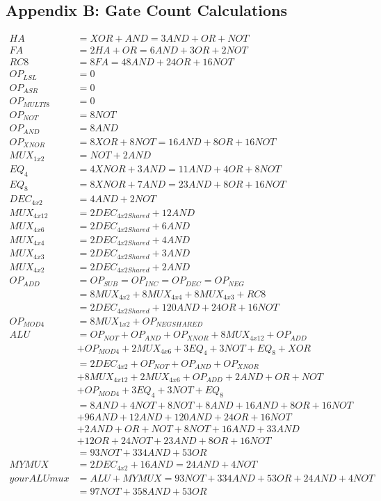 \documentclass[12pt,letterpaper,titlepage]{article}
\begin{document}
\begin{raggedright}
\section{Appendix B: Gate Count Calculations}
\label{gcount}
\begin{align*}
	HA&=XOR+AND=3AND+OR+NOT\\
	FA&=2HA+OR=6AND+3OR+2NOT\\
	RC8&=8FA=48AND+24OR+16NOT\\
	OP_{LSL}&=0\\
	OP_{ASR}&=0\\
	OP_{MULTI8}&=0\\
	OP_{NOT}&=8NOT\\
	OP_{AND}&=8AND\\
	OP_{XNOR}&=8XOR+8NOT=16AND+8OR+16NOT\\
	MUX_{1x2}&=NOT+2AND\\
	EQ_{4}&=4XNOR+3AND=11AND+4OR+8NOT\\
	EQ_{8}&=8XNOR+7AND=23AND+8OR+16NOT\\
	DEC_{4x2}&=4AND+2NOT\\
	MUX_{4x12}&=2DEC_{4x2Shared}+12AND\\
	MUX_{4x6}&=2DEC_{4x2Shared}+6AND\\
	MUX_{4x4}&=2DEC_{4x2Shared}+4AND\\
	MUX_{4x3}&=2DEC_{4x2Shared}+3AND\\
	MUX_{4x2}&=2DEC_{4x2Shared}+2AND\\
	OP_{ADD}&=OP_{SUB}=OP_{INC}=OP_{DEC}=OP_{NEG}\\
	&=8MUX_{4x2}+8MUX_{4x4}+8MUX_{4x3}+RC8\\
	&=2DEC_{4x2Shared}+120AND+24OR+16NOT\\
	OP_{MOD4}&=8MUX_{1x2}+OP_{NEG SHARED}\\
	ALU&=OP_{NOT}+OP_{AND}+OP_{XNOR}+8MUX_{4x12}+OP_{ADD}\\
	   &+OP_{MOD4}+2MUX_{4x6}+3EQ_{4}+3NOT+EQ_{8}+XOR\\
	   &=2DEC_{4x2}+OP_{NOT}+OP_{AND}+OP_{XNOR}\\
	   &+8MUX_{4x12}+2MUX_{4x6}+OP_{ADD}+2AND+OR+NOT\\
	   &+OP_{MOD4}+3EQ_{4}+3NOT+EQ_{8}\\
	   &=8AND+4NOT+8NOT+8AND+16AND+8OR+16NOT\\
	   &+96AND+12AND+120AND+24OR+16NOT\\
	   &+2AND+OR+NOT+8NOT+16AND+33AND\\
	   &+12OR+24NOT+23AND+8OR+16NOT\\
	   &=93NOT+334AND+53OR\\
	MYMUX&=2DEC_{4x2}+16AND=24AND+4NOT\\
	yourALUmux&=ALU+MYMUX=93NOT+334AND+53OR+24AND+4NOT\\
	&=97NOT+358AND+53OR
\end{align*}
\clearpage


\end{raggedright}
\end{document}
